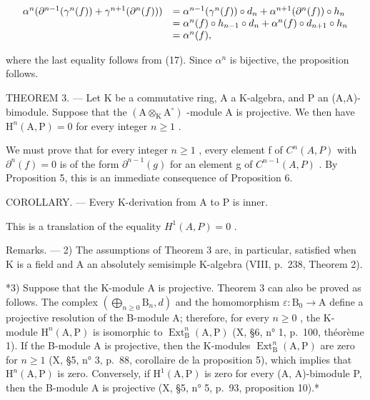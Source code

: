 \[
\begin{array}{r l} \alpha^ {n} (\partial^ {n - 1} (\gamma^ {n} (f)) + \gamma^ {n + 1} (\partial^ {n} (f))) & = \alpha^ {n - 1} (\gamma^ {n} (f)) \circ d _ {n} + \alpha^ {n + 1} (\partial^ {n} (f)) \circ h _ {n} \\ & = \alpha^ {n} (f) \circ h _ {n - 1} \circ d _ {n} + \alpha^ {n} (f) \circ d _ {n + 1} \circ h _ {n} \\ & = \alpha^ {n} (f), \end{array}
\]

where the last equality follows from (17). Since \(\alpha^{n}\) is bijective, the proposition follows.

THEOREM 3. --- Let K be a commutative ring, A a K-algebra, and P an (A,A)-bimodule. Suppose that the \((\mathrm{A}\otimes_{\mathrm{K}}\mathrm{A}^{\circ})\) -module A is projective. We then have \(\mathrm{H}^{n}(\mathrm{A},\mathrm{P})=0\) for every integer \(n\geqslant1\) .

We must prove that for every integer \(n \geqslant 1\) , every element f of \(C^{n}(A, P)\) with \(\partial^{n}(f) = 0\) is of the form \(\partial^{n-1}(g)\) for an element g of \(C^{n-1}(A, P)\) . By Proposition 5, this is an immediate consequence of Proposition 6.

COROLLARY. --- Every K-derivation from A to P is inner.

This is a translation of the equality \(H^{1}(A,P)=0\) .

Remarks. --- 2) The assumptions of Theorem 3 are, in particular, satisfied when K is a field and A an absolutely semisimple K-algebra (VIII, p.~238, Theorem 2).

*3) Suppose that the K-module A is projective. Theorem 3 can also be proved as follows. The complex \((\bigoplus_{n\geqslant 0}\mathrm{B}_n,d)\) and the homomorphism \(\varepsilon :\mathrm{B}_0\to \mathrm{A}\) define a projective resolution of the B-module A; therefore, for every \(n\geqslant 0\) , the K-module \(\mathrm{H}^n (\mathrm{A},\mathrm{P})\) is isomorphic to \(\operatorname {Ext}_{\mathrm{B}}^{n}(\mathrm{A},\mathrm{P})\) (X, §6, n° 1, p.~100, théorème 1). If the B-module A is projective, then the K-modules \(\operatorname {Ext}_{\mathrm{B}}^{n}(\mathrm{A},\mathrm{P})\) are zero for \(n\geqslant 1\) (X, §5, n° 3, p.~88, corollaire de la proposition 5), which implies that \(\mathrm{H}^n (\mathrm{A},\mathrm{P})\) is zero. Conversely, if \(\mathrm{H}^1 (\mathrm{A},\mathrm{P})\) is zero for every (A, A)-bimodule P, then the B-module A is projective (X, §5, n° 5, p.~93, proposition 10).*

